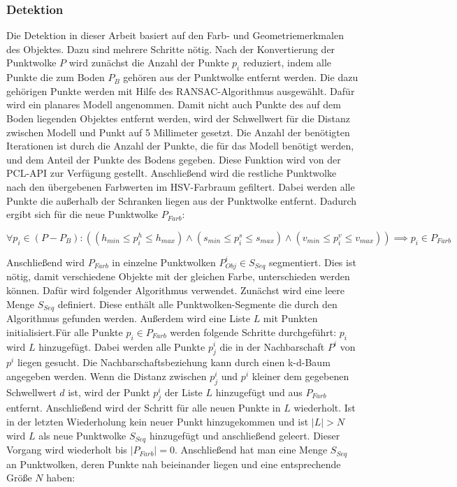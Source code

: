 \subsubsection{Detektion}
\label{sec:detek}
Die Detektion in dieser Arbeit basiert auf den Farb- und Geometriemerkmalen des Objektes. Dazu sind mehrere Schritte nötig. Nach der Konvertierung der Punktwolke $P$ wird zunächst die Anzahl der Punkte $p_i$ reduziert, indem alle Punkte die zum Boden $P_B$ gehören aus der Punktwolke entfernt werden. Die dazu gehörigen Punkte werden mit Hilfe des RANSAC-Algorithmus ausgewählt. Dafür wird ein planares Modell angenommen. Damit nicht auch Punkte des auf dem Boden liegenden Objektes entfernt werden, wird der Schwellwert für die Distanz zwischen Modell und Punkt auf 5 Millimeter gesetzt. Die Anzahl der benötigten Iterationen ist durch die Anzahl der Punkte, die für das Modell benötigt werden, und dem Anteil der Punkte des Bodens gegeben. Diese Funktion wird von der PCL-API zur Verfügung gestellt. Anschließend wird die restliche Punktwolke nach den übergebenen Farbwerten im HSV-Farbraum gefiltert. Dabei werden alle Punkte die außerhalb der Schranken liegen aus der Punktwolke entfernt. Dadurch ergibt sich für die neue Punktwolke $P_{Farb}$:

\begin{equation}
	\forall p_i \in (P - P_B): ((h_{min} \leq p_i^h \leq h_{max}) \wedge (s_{min} \leq p_i^s \leq s_{max}) \wedge (v_{min} \leq p_i^v \leq v_{max})) 
	\implies p_i \in P_{Farb}
\end{equation}

Anschließend wird $P_{Farb}$ in einzelne Punktwolken $P_{Obj}^i \in S_{Seq}$ segmentiert. Dies ist nötig, damit verschiedene Objekte mit der gleichen Farbe, unterschieden werden können. Dafür wird folgender Algorithmus verwendet. Zunächst wird eine leere Menge $S_{Seq}$ definiert. Diese enthält alle Punktwolken-Segmente die durch den Algorithmus gefunden werden. Außerdem wird eine Liste $L$ mit Punkten initialisiert.Für alle Punkte $p_i \in P_{Farb}$ werden folgende Schritte durchgeführt: $p_i$ wird $L$ hinzugefügt. Dabei werden alle Punkte $p^i_j$ die in der Nachbarschaft $P^i$ von $p^i$ liegen gesucht.  Die Nachbarschaftsbeziehung kann durch einen k-d-Baum angegeben werden. Wenn die Distanz zwischen $p^i_j$ und $p^i$ kleiner dem gegebenen Schwellwert $d$ ist, wird der Punkt $p^i_j$ der Liste $L$ hinzugefügt und aus $P_{Farb}$ entfernt. Anschließend wird der Schritt für alle neuen Punkte in $L$ wiederholt. Ist in der letzten Wiederholung kein neuer Punkt hinzugekommen und ist $|L| > N$ wird $L$ als neue Punktwolke $S_{Seq}$ hinzugefügt und anschließend geleert. Dieser Vorgang wird wiederholt bis $|P_{Farb}| = 0$. Anschließend hat man eine Menge $S_{Seq}$ an Punktwolken, deren Punkte nah beieinander liegen und eine entsprechende Größe $N$ haben:


